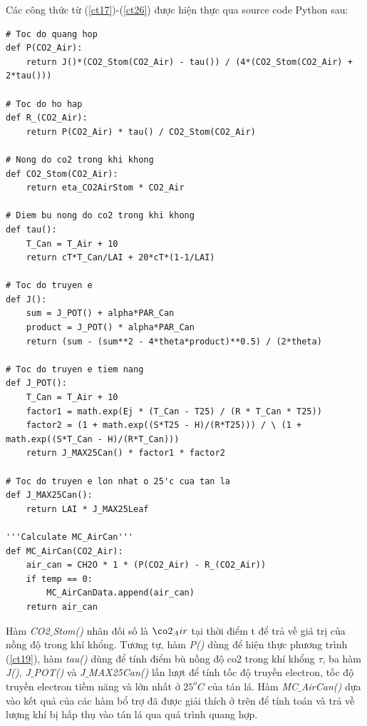 \documentclass[13pt,a4paper]{article}
\begin{document}
			Các công thức từ (\ref{ct17})-(\ref{ct26}) được hiện thực qua source code Python sau:
\begin{lstlisting}
# Toc do quang hop
def P(CO2_Air):
	return J()*(CO2_Stom(CO2_Air) - tau()) / (4*(CO2_Stom(CO2_Air) + 2*tau()))

# Toc do ho hap
def R_(CO2_Air):
	return P(CO2_Air) * tau() / CO2_Stom(CO2_Air)

# Nong do co2 trong khi khong
def CO2_Stom(CO2_Air):
	return eta_CO2AirStom * CO2_Air

# Diem bu nong do co2 trong khi khong
def tau():
	T_Can = T_Air + 10
	return cT*T_Can/LAI + 20*cT*(1-1/LAI)

# Toc do truyen e
def J():
	sum = J_POT() + alpha*PAR_Can
	product = J_POT() * alpha*PAR_Can
	return (sum - (sum**2 - 4*theta*product)**0.5) / (2*theta)

# Toc do truyen e tiem nang
def J_POT():
	T_Can = T_Air + 10
	factor1 = math.exp(Ej * (T_Can - T25) / (R * T_Can * T25))
	factor2 = (1 + math.exp((S*T25 - H)/(R*T25))) / \ (1 + math.exp((S*T_Can - H)/(R*T_Can)))
	return J_MAX25Can() * factor1 * factor2

# Toc do truyen e lon nhat o 25'c cua tan la
def J_MAX25Can():
	return LAI * J_MAX25Leaf
	
'''Calculate MC_AirCan'''
def MC_AirCan(CO2_Air):
	air_can = CH2O * 1 * (P(CO2_Air) - R_(CO2_Air))
	if temp == 0:
		MC_AirCanData.append(air_can)
	return air_can
\end{lstlisting}
		Hàm \textit{CO2$\_$Stom()} nhân đối số là $\co2_Air$ tại thời điểm t để trả về giá trị của nồng độ  trong khí khổng. Tương tự, hàm \textit{P()} dùng để hiện thực phương trình (\ref{ct19}), hàm \textit{tau()} dùng để tính điểm bù nồng độ co2 trong khí khổng $\tau$, ba hàm \textit{J()}, \textit{J$\_$POT()} và \textit{J$\_$MAX25Can()} lần lượt để tính tốc độ truyền electron, tốc độ truyền electron tiềm năng và lớn nhất ở $25^oC$ của tán lá. Hàm \textit{MC$\_$AirCan()} dựa vào kết quả của các hàm bổ trợ đã được giải thích ở trên để tính toán và trả về lượng khí  bị hấp thụ vào tán lá qua quá trình quang hợp.
\end{document}
